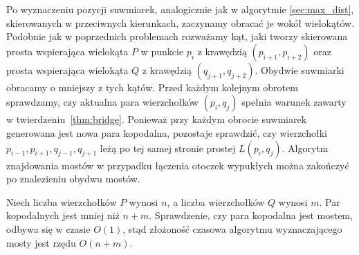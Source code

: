 Po wyznaczeniu pozycji suwmiarek, analogicznie jak w algorytmie
\ref{sec:max_dist}, skierowanych w przeciwnych kierunkach, zaczynamy
obracać je wokół wielokątów. Podobnie jak w poprzednich problemach
rozważamy kąt, jaki tworzy skierowana prosta wspierająca wielokąta $P$
w punkcie $p_i$ z krawędzią $(p_{i+1}, p_{i+2})$ oraz prosta
wspierająca wielokąta $Q$ z krawędzią $(q_{j+1}, q_{j+2})$. Obydwie
suwmiarki obracamy o mniejszy z tych kątów. Przed każdym kolejnym
obrotem sprawdzamy, czy aktualna para wierzchołków $(p_i, q_j)$
spełnia warunek zawarty w twierdzeniu~\ref{thm:bridge}. Ponieważ przy
każdym obrocie suwmiarek generowana jest nowa para kopodalna,
pozostaje sprawdzić, czy wierzchołki $p_{i-1}, p_{i+1}, q_{j-1},
q_{j+1}$ leżą po tej samej stronie prostej $L(p_i, q_j)$. Algorytm
znajdowania mostów w przypadku łączenia otoczek wypukłych można
zakończyć po znalezieniu obydwu mostów.

Niech liczba wierzchołków $P$ wynosi $n$, a liczba wierzchołków $Q$
wynosi $m$. Par kopodalnych jest mniej niż $n + m$. Sprawdzenie, czy
para kopodalna jest mostem, odbywa się w czasie $O(1)$, stąd złożoność
czasowa algorytmu wyznaczającego mosty jest rzędu $O(n + m)$.

